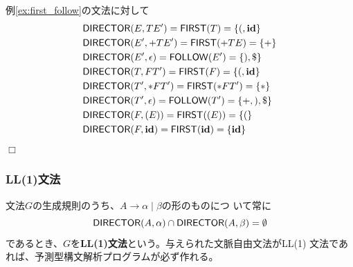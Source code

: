 \begin{example}
 例\ref{ex:first_follow}の文法に対して
 \begin{align*}
  & {\sf DIRECTOR}(E, TE') = {\sf FIRST}(T) = \{(, {\bf id}\} \\
  & {\sf DIRECTOR}(E', +TE') = {\sf FIRST}(+TE) = \{+\} \\
  & {\sf DIRECTOR}(E', \epsilon) = {\sf FOLLOW}(E') = \{), \$\} \\
  & {\sf DIRECTOR}(T, FT') = {\sf FIRST}(F) = \{(, {\bf id}\} \\
  & {\sf DIRECTOR}(T', *FT') = {\sf FIRST}(*FT') = \{*\} \\
  & {\sf DIRECTOR}(T', \epsilon) = {\sf FOLLOW}(T') = \{+, ), \$\} \\
  & {\sf DIRECTOR}(F, (E)) = {\sf FIRST}((E)) = \{(\} \\
  & {\sf DIRECTOR}(F, {\bf id}) = {\sf FIRST}({\bf id}) = \{{\bf id}\}
 \end{align*}$\Box$
\end{example}

\subsubsection{LL(1)文法}

文法$G$の生成規則のうち、$A \rightarrow \alpha \mid \beta$の形のものにつ
いて常に
\begin{equation}
 {\sf DIRECTOR}(A, \alpha) \cap {\sf DIRECTOR}(A, \beta) = \emptyset\label{173231_31Mar06}
\end{equation}
であるとき、$G$を\textbf{LL(1)文法}という。与えられた文脈自由文法がLL(1)
文法であれば、予測型構文解析プログラムが必ず作れる。


